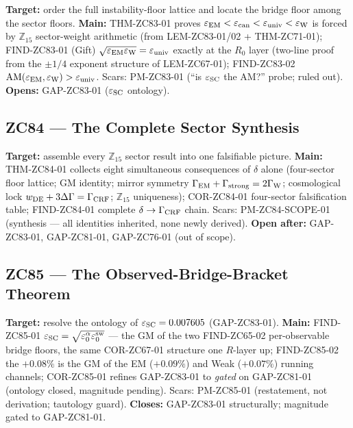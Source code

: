 \documentclass[11pt, a4paper]{article}
\begin{document}
\begin{zcbox}[title={ZC83: THM-ZC83-01 --- Floor Lattice Ordering
  (Near-Formal) + FIND-ZC83-01 (Gift)}]
\sloppy
\textbf{Target:} order the full instability-floor lattice and locate the
bridge floor among the sector floors.
\textbf{Main:} THM-ZC83-01 proves $\varepsilon_{\rm EM}<\varepsilon_{\rm can}
<\varepsilon_{\rm univ}<\varepsilon_{\rm W}$ is forced by $\mathbb{Z}_{15}$
sector-weight arithmetic (from LEM-ZC83-01/02 + THM-ZC71-01);
FIND-ZC83-01 (Gift) $\sqrt{\varepsilon_{\rm EM}\varepsilon_{\rm W}}
=\varepsilon_{\rm univ}$ exactly at the $R_0$ layer (two-line proof from
the $\pm1/4$ exponent structure of LEM-ZC67-01); FIND-ZC83-02
${\rm AM}(\varepsilon_{\rm EM},\varepsilon_{\rm W})>\varepsilon_{\rm univ}$.
Scars: PM-ZC83-01 (``is $\varepsilon_{\rm SC}$ the AM?'' probe; ruled out).
\textbf{Opens:} GAP-ZC83-01 ($\varepsilon_{\rm SC}$ ontology).
\end{zcbox}

\subsection{ZC84 --- The Complete Sector Synthesis}

\begin{zcbox}[title={ZC84: THM-ZC84-01 --- Complete Sector Synthesis
  (Exact)}]
\sloppy
\textbf{Target:} assemble every $\mathbb{Z}_{15}$ sector result into one
falsifiable picture.
\textbf{Main:} THM-ZC84-01 collects eight simultaneous consequences of
$\delta$ alone (four-sector floor lattice; GM identity; mirror symmetry
$\Gamma_{\rm EM}+\Gamma_{\rm strong}=2\Gamma_{\rm W}$; cosmological lock
$w_{\rm DE}+3\Delta\Gamma=\Gamma_{\rm CRF}$; $\mathbb{Z}_{15}$
uniqueness); COR-ZC84-01 four-sector falsification table; FIND-ZC84-01
complete $\delta\to\Gamma_{\rm CRF}$ chain. Scars: PM-ZC84-SCOPE-01
(synthesis --- all identities inherited, none newly derived).
\textbf{Open after:} GAP-ZC83-01, GAP-ZC81-01, GAP-ZC76-01 (out of scope).
\end{zcbox}

\subsection{ZC85 --- The Observed-Bridge-Bracket Theorem}

\begin{zcbox}[title={ZC85: FIND-ZC85-01 --- Observed-Bridge Bracket
  (Exact restatement) + COR-ZC85-01}]
\sloppy
\textbf{Target:} resolve the ontology of $\varepsilon_{\rm SC}=0.007605$
(GAP-ZC83-01).
\textbf{Main:} FIND-ZC85-01 $\varepsilon_{\rm SC}=\sqrt{\varepsilon_0^{\alpha}
\varepsilon_0^{\rm sw}}$ --- the GM of the two FIND-ZC65-02 per-observable
bridge floors, the same COR-ZC67-01 structure one $R$-layer up;
FIND-ZC85-02 the $+0.08\%$ is the GM of the EM ($+0.09\%$) and Weak
($+0.07\%$) running channels; COR-ZC85-01 refines GAP-ZC83-01 to
\emph{gated} on GAP-ZC81-01 (ontology closed, magnitude pending). Scars:
PM-ZC85-01 (restatement, not derivation; tautology guard).
\textbf{Closes:} GAP-ZC83-01 structurally; magnitude gated to GAP-ZC81-01.
\end{zcbox}
\end{document}

